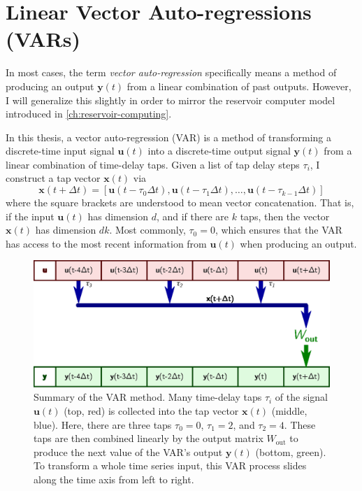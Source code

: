 \section{Linear Vector Auto-regressions (VARs)}

In most cases, the term \emph{vector auto-regression} specifically
means a method of producing an output $\bm{y}(t)$ from a linear
combination of past outputs. However, I will generalize this slightly
in order to mirror the reservoir computer model introduced in
\cref{ch:reservoir-computing}.

In this thesis, a vector auto-regression (VAR) is a method of
transforming a discrete-time input signal $\bm{u}(t)$ into a
discrete-time output signal $\bm{y}(t)$ from a linear combination of
time-delay taps. Given a list of tap delay steps $\tau_i$, I construct
a tap vector $\bm{x}(t)$ via
\begin{equation}
  \label{eq:var-x}
  \bm{x}(t + \Delta t) = [\bm{u}(t - \tau_0 \Delta t), \bm{u}(t - \tau_1 \Delta t), \dots, \bm{u}(t - \tau_{k-1} \Delta t)]
\end{equation}
where the square brackets are understood to mean vector
concatenation. That is, if the input $\bm{u}(t)$ has dimension $d$,
and if there are $k$ taps, then the vector $\bm{x}(t)$ has dimension
$dk$. Most commonly, $\tau_0 = 0$, which ensures that the VAR has access to the most recent information from $\bm{u}(t)$ when producing an output.

\begin{figure}
  \includegraphics{figures/var-infer}
  \caption{Summary of the VAR method. Many time-delay taps $\tau_i$ of
    the signal $\bm{u}(t)$ (top, red) is collected into the tap vector
    $\bm{x}(t)$ (middle, blue). Here, there are three taps $\tau_0=0$,
    $\tau_1=2$, and $\tau_2=4$. These taps are then combined linearly
    by the output matrix $W_\text{out}$ to produce the next value of
    the VAR's output $\bm{y}(t)$ (bottom, green). To transform a whole
    time series input, this VAR process slides along the time axis
    from left to right.}
  \label{fig:var-infer}
\end{figure}

